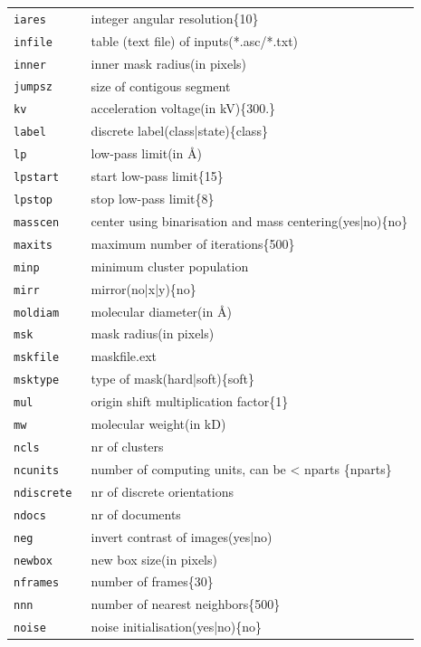 \documentclass[a4paper,11pt]{article}
\begin{document}
\begin{tabular}{ll}
\texttt{iares        }&{ integer angular resolution\{10\}}\\
\texttt{infile       }&{ table (text file) of inputs(*.asc/*.txt)}\\
\texttt{inner        }&{ inner mask radius(in pixels)}\\
\texttt{jumpsz       }&{ size of contigous segment}\\
\texttt{kv           }&{ acceleration voltage(in kV)\{300.\}}\\
\texttt{label        }&{ discrete label(class|state)\{class\}}\\
\texttt{lp           }&{ low-pass limit(in \AA{})}\\
\texttt{lpstart      }&{ start low-pass limit\{15\}}\\
\texttt{lpstop       }&{ stop low-pass limit\{8\}}\\
\texttt{masscen      }&{ center using binarisation and mass centering(yes|no)\{no\}}\\
\texttt{maxits       }&{ maximum number of iterations\{500\}}\\
\texttt{minp         }&{ minimum cluster population}\\
\texttt{mirr         }&{ mirror(no|x|y)\{no\}}\\
\texttt{moldiam      }&{ molecular diameter(in \AA{})}\\
\texttt{msk          }&{ mask radius(in pixels)}\\
\texttt{mskfile      }&{ maskfile.ext}\\
\texttt{msktype      }&{ type of mask(hard|soft)\{soft\}}\\
\texttt{mul          }&{ origin shift multiplication factor\{1\}}\\
\texttt{mw           }&{ molecular weight(in kD)}\\
\texttt{ncls         }&{ nr of clusters}\\
\texttt{ncunits      }&{ number of computing units, can be < nparts \{nparts\}}\\
\texttt{ndiscrete    }&{ nr of discrete orientations}\\
\texttt{ndocs        }&{ nr of documents}\\
\texttt{neg          }&{ invert contrast of images(yes|no)}\\
\texttt{newbox       }&{ new box size(in pixels)}\\
\texttt{nframes      }&{ number of frames\{30\}}\\
\texttt{nnn          }&{ number of nearest neighbors\{500\}}\\
\texttt{noise        }&{ noise initialisation(yes|no)\{no\}}\\
\end{tabular}
\end{document}
